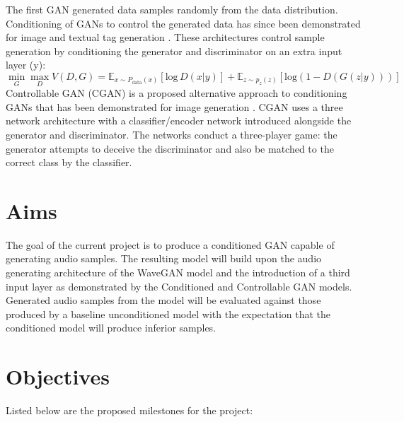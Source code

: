 \documentclass[a4paper, dvipsnames, titlepage]{article}
\begin{document}
The first GAN generated data samples randomly from the data distribution.
Conditioning of GANs to control the generated data has since been demonstrated for image and textual tag generation \citep{2014arXiv1411.1784M}.
These architectures control sample generation by conditioning the generator and discriminator on an extra input layer (y):
\newline
%
\begin{equation}
  \min_{G} \max_{D} V(D,G) = \mathbb{E}_{x \sim P_\mathrm{data}(x)}[\mathrm{log}\,D(x|y)] + \mathbb{E}_{z \sim p_z(z)}[\mathrm{log} (1 - D(G(z|y)))]
\end{equation}
%
\newline
Controllable GAN (CGAN) is a proposed alternative approach to conditioning GANs that has been demonstrated for image generation \citep{2017arXiv170800598L}.
CGAN uses a three network architecture with a classifier/encoder network introduced alongside the generator and discriminator.
The networks conduct a three-player game: the generator attempts to deceive the discriminator and also be matched to the correct class by the classifier.

\newpage

\section{Aims}

The goal of the current project is to produce a conditioned GAN capable of generating audio samples.
The resulting model will build upon the audio generating architecture of the WaveGAN model and the introduction of a third input layer as demonstrated by the Conditioned and Controllable GAN models.
Generated audio samples from the model will be evaluated against those produced by a baseline unconditioned model with the expectation that the conditioned model will produce inferior samples.

\newpage

\section{Objectives}

Listed below are the proposed milestones for the project:
\end{document}
